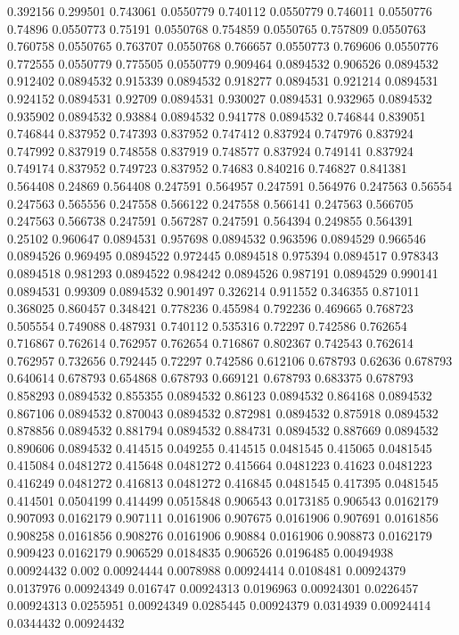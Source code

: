 0.392156 0.299501
0.743061 0.0550779
0.740112 0.0550779
0.746011 0.0550776
0.74896 0.0550773
0.75191 0.0550768
0.754859 0.0550765
0.757809 0.0550763
0.760758 0.0550765
0.763707 0.0550768
0.766657 0.0550773
0.769606 0.0550776
0.772555 0.0550779
0.775505 0.0550779
0.909464 0.0894532
0.906526 0.0894532
0.912402 0.0894532
0.915339 0.0894532
0.918277 0.0894531
0.921214 0.0894531
0.924152 0.0894531
0.92709 0.0894531
0.930027 0.0894531
0.932965 0.0894532
0.935902 0.0894532
0.93884 0.0894532
0.941778 0.0894532
0.746844 0.839051
0.746844 0.837952
0.747393 0.837952
0.747412 0.837924
0.747976 0.837924
0.747992 0.837919
0.748558 0.837919
0.748577 0.837924
0.749141 0.837924
0.749174 0.837952
0.749723 0.837952
0.74683 0.840216
0.746827 0.841381
0.564408 0.24869
0.564408 0.247591
0.564957 0.247591
0.564976 0.247563
0.56554 0.247563
0.565556 0.247558
0.566122 0.247558
0.566141 0.247563
0.566705 0.247563
0.566738 0.247591
0.567287 0.247591
0.564394 0.249855
0.564391 0.25102
0.960647 0.0894531
0.957698 0.0894532
0.963596 0.0894529
0.966546 0.0894526
0.969495 0.0894522
0.972445 0.0894518
0.975394 0.0894517
0.978343 0.0894518
0.981293 0.0894522
0.984242 0.0894526
0.987191 0.0894529
0.990141 0.0894531
0.99309 0.0894532
0.901497 0.326214
0.911552 0.346355
0.871011 0.368025
0.860457 0.348421
0.778236 0.455984
0.792236 0.469665
0.768723 0.505554
0.749088 0.487931
0.740112 0.535316
0.72297 0.742586
0.762654 0.716867
0.762614 0.762957
0.762654 0.716867
0.802367 0.742543
0.762614 0.762957
0.732656 0.792445
0.72297 0.742586
0.612106 0.678793
0.62636 0.678793
0.640614 0.678793
0.654868 0.678793
0.669121 0.678793
0.683375 0.678793
0.858293 0.0894532
0.855355 0.0894532
0.86123 0.0894532
0.864168 0.0894532
0.867106 0.0894532
0.870043 0.0894532
0.872981 0.0894532
0.875918 0.0894532
0.878856 0.0894532
0.881794 0.0894532
0.884731 0.0894532
0.887669 0.0894532
0.890606 0.0894532
0.414515 0.049255
0.414515 0.0481545
0.415065 0.0481545
0.415084 0.0481272
0.415648 0.0481272
0.415664 0.0481223
0.41623 0.0481223
0.416249 0.0481272
0.416813 0.0481272
0.416845 0.0481545
0.417395 0.0481545
0.414501 0.0504199
0.414499 0.0515848
0.906543 0.0173185
0.906543 0.0162179
0.907093 0.0162179
0.907111 0.0161906
0.907675 0.0161906
0.907691 0.0161856
0.908258 0.0161856
0.908276 0.0161906
0.90884 0.0161906
0.908873 0.0162179
0.909423 0.0162179
0.906529 0.0184835
0.906526 0.0196485
0.00494938 0.00924432
0.002 0.00924444
0.0078988 0.00924414
0.0108481 0.00924379
0.0137976 0.00924349
0.016747 0.00924313
0.0196963 0.00924301
0.0226457 0.00924313
0.0255951 0.00924349
0.0285445 0.00924379
0.0314939 0.00924414
0.0344432 0.00924432
